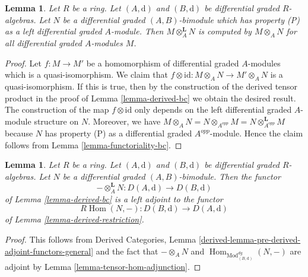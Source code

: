 \documentclass{stacks-project}
\theoremstyle{plain}
\newtheorem{lemma}[subsection]{Lemma}
\theoremstyle{definition}
\theoremstyle{remark}
\numberwithin{equation}{subsection}
\def\Hom{\mathop{\mathrm{Hom}}\nolimits}
\begin{document}
\begin{lemma}
\label{lemma-compute-bc}
Let $R$ be a ring. Let $(A, \text{d})$ and $(B, \text{d})$ be
differential graded $R$-algebras. Let $N$ be a differential graded
$(A, B)$-bimodule which has property (P) as a left differential graded
$A$-module. Then $M \otimes_A^\mathbf{L} N$ is computed by
$M \otimes_A N$ for all differential graded $A$-modules $M$.
\end{lemma}

\begin{proof}
Let $f : M \to M'$ be a homomorphism of differential graded $A$-modules
which is a quasi-isomorphism. We claim that $f \otimes \text{id} :
M \otimes_A N \to M' \otimes_A N$ is a quasi-isomorphism. If this
is true, then by the construction of the derived tensor product
in the proof of Lemma \ref{lemma-derived-bc} we obtain the desired result.
The construction of the map $f \otimes \text{id}$ only depends
on the left differential graded $A$-module structure on $N$.
Moreover, we have $M \otimes_A N = N \otimes_{A^{opp}} M =
N \otimes_{A^{opp}}^\mathbf{L} M$ because $N$ has property (P) as
a differential graded $A^{opp}$-module. Hence the claim follows
from Lemma \ref{lemma-functoriality-bc}.
\end{proof}

\begin{lemma}
\label{lemma-tensor-hom-adjoint}
Let $R$ be a ring.
Let $(A, \text{d})$ and $(B, \text{d})$ be differential graded $R$-algebras.
Let $N$ be a differential graded $(A, B)$-bimodule.
Then the functor
$$
- \otimes_A^\mathbf{L} N : D(A, \text{d}) \longrightarrow D(B, \text{d})
$$
of Lemma \ref{lemma-derived-bc} is a left adjoint to the functor
$$
R\Hom(N, -) : D(B, \text{d}) \longrightarrow D(A, \text{d})
$$
of Lemma \ref{lemma-derived-restriction}.
\end{lemma}

\begin{proof}
This follows from Derived Categories, Lemma
\ref{derived-lemma-pre-derived-adjoint-functors-general}
and the fact that $- \otimes_A N$ and
$\Hom_{\text{Mod}^{dg}_{(B, \text{d})}}(N, -)$ are adjoint by
Lemma \ref{lemma-tensor-hom-adjunction}.
\end{proof}
\end{document}
